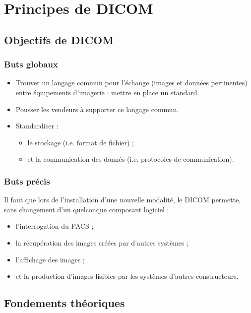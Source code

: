 \section{Principes de DICOM}

	\subsection{Objectifs de DICOM}
	
	\frame
	{
		\frametitle{Buts globaux}
		\begin{itemize}
			\item<1-> Trouver un langage commun pour l'\'echange (images et donn\'ees pertinentes) entre \'equipements d'imagerie : mettre en place un standard.
			\item<2-> Pousser les vendeurs \`a supporter ce langage commun.
			\item<3-> Standardiser :
			\begin{itemize}
				\item<4-> le stockage (i.e. format de fichier) ;
				\item<5-> et la communication des donn\'es (i.e. protocoles de communication).
			\end{itemize}
		\end{itemize}
	}
	
	\frame
	{
		\frametitle{Buts pr\'ecis}
		
		Il faut que lors de l'installation d'une nouvelle modalit\'e, le DICOM permette, sans changement d'un quelconque composant logiciel :
		\begin{itemize}
			\item<1-> l'interrogation du PACS ;
			\item<2-> la r\'ecup\'eration des images cr\'e\'ees par d'autres syst\`emes ;
			\item<3-> l'affichage des images ;
			\item<4-> et la production d'images lisibles par les syst\`emes d'autres constructeurs.
		\end{itemize}
	}

	\subsection{Fondements th\'eoriques}

